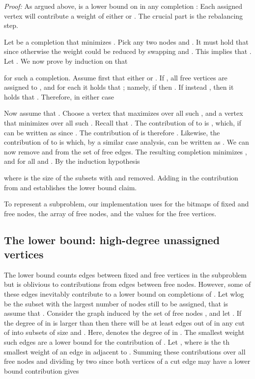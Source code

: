 \documentclass[a4paper,11pt]{article}
\newenvironment{proof}{\emph{Proof:}}{\newline}
\begin{document}
\begin{proof}
As argued above,  is a lower bound on  in any completion : Each
assigned vertex will contribute a weight of either  or
. The crucial part is the rebalancing step. 

Let  be a completion that minimizes . Pick any two nodes  and . It must hold that
 since otherwise the weight
 could be reduced by
swapping  and . This implies that .  Let
.  We now prove by induction on
 that

for such a completion. Assume first that either  or . If
, all free vertices are assigned to , and for each  it
holds that ;
namely, if  then .  If instead ,
then it holds that
. Therefore, in
either case


Now assume that . Choose a vertex  that maximizes  over all such , and a
vertex  that minimizes  over all
such . Recall that .  The contribution of
 to  is
, which, if  can be written as
 since . The contribution of  is therefore
. Likewise, the
contribution of  to  is  which, by a similar case analysis, can be written
as . We can now remove 
and  from the set of free edges. The resulting completion
 minimizes
, and  for all  and . By the induction hypothesis


where  is the size of the subsets with  and  removed.
Adding in the contribution from  and  establishes the lower
bound claim.
\end{proof}

To represent a subproblem, our implementation uses  for the
bitmaps of fixed and free nodes, the array of free nodes, and the
 values for the free vertices.

\subsection{The lower bound: high-degree unassigned vertices}
\label{sec:highdegree}

The lower bound counts edges between fixed and free vertices in the
subproblem  but is oblivious to contributions from edges
between free nodes. However, some of these edges inevitably contribute
to a lower bound on completions of . Let wlog  be the
subset with the largest number of nodes still to be assigned, that is
assume that . Consider the graph  induced by
the set of free nodes , and let . If the degree of  in
 is larger than  then there will be at least
 edges out of  in any cut of  into subsets of
size  and . Here,  denotes the degree of  in
.  The smallest weight such edges are a lower bound for the
contribution of . Let , where  is the th
smallest weight of an edge in  adjacent to . Summing these
contributions over all free nodes and dividing by two since both
vertices of a cut edge may have a lower bound contribution gives
\end{document}
